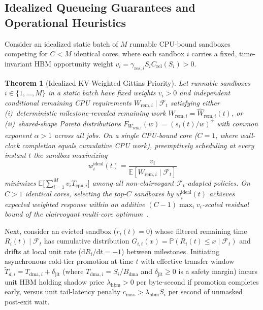 \documentclass[10pt,journal,compsoc]{IEEEtran}
\newtheorem{theorem}{Theorem}
\theoremstyle{definition}
\theoremstyle{remark}
\newcommand{\E}{\mathbb{E}}
\newcommand{\Prob}{\mathbb{P}}
\begin{document}
\subsection{Idealized Queueing Guarantees and Operational Heuristics}
Consider an idealized static batch of $M$ runnable CPU-bound sandboxes competing for $C < M$ identical cores, where each sandbox $i$ carries a fixed, time-invariant HBM opportunity weight $v_i = \gamma_{\mathrm{res},i} S_i C_{\mathrm{rel}}(S_i) > 0$.

\begin{theorem}[Idealized KV-Weighted Gittins Priority]\label{thm:gittins}
Let runnable sandboxes $i \in \{1,\dots,M\}$ in a static batch have fixed weights $v_i > 0$ and independent conditional remaining CPU requirements $W_{\mathrm{rem},i} \mid \mathcal{F}_t$ satisfying either (i)~deterministic milestone-revealed remaining work $W_{\mathrm{rem},i} = \hat{W}_{\mathrm{rem},i}(t)$, or (ii)~shared-shape Pareto distributions $\bar{F}_{W_{\mathrm{rem},i}}(w) = (s_i(t)/w)^\alpha$ with common exponent $\alpha > 1$ across all jobs. On a single CPU-bound core ($C = 1$, where wall-clock completion equals cumulative CPU work), preemptively scheduling at every instant $t$ the sandbox maximizing
\begin{equation}\label{eq:gittins}
w_i^{\mathrm{ideal}}(t) = \frac{v_i}{\E[W_{\mathrm{rem},i} \mid \mathcal{F}_t]}
\end{equation}
minimizes $\E\bigl[\sum_{i=1}^M v_i T_{\mathrm{cpu},i}\bigr]$ among all non-clairvoyant $\mathcal{F}_t$-adapted policies. On $C > 1$ identical cores, selecting the top-$C$ sandboxes by $w_i^{\mathrm{ideal}}(t)$ achieves expected weighted response within an additive $(C - 1)\max_i v_i$-scaled residual bound of the clairvoyant multi-core optimum~\cite{aalto2009gittins,scully2020gittins}.
\end{theorem}

Next, consider an evicted sandbox ($r_i(t) = 0$) whose filtered remaining time $R_i(t) \mid \mathcal{F}_t$ has cumulative distribution $G_{i,t}(x) = \Prob(R_i(t) \le x \mid \mathcal{F}_t)$ and drifts at local unit rate ($\mathrm{d}R_i/\mathrm{d}t = -1$) between milestones. Initiating asynchronous cold-tier promotion at time $t$ with effective transfer window $\tilde{T}_{d,i} = T_{\mathrm{dma},i} + \delta_{\mathrm{jit}}$ (where $T_{\mathrm{dma},i} = S_i / B_{\mathrm{dma}}$ and $\delta_{\mathrm{jit}} \ge 0$ is a safety margin) incurs unit HBM holding shadow price $\lambda_{\mathrm{hbm}} > 0$ per byte-second if promotion completes early, versus unit tail-latency penalty $c_{\mathrm{miss}} > \lambda_{\mathrm{hbm}} S_i$ per second of unmasked post-exit wait.
\end{document}
